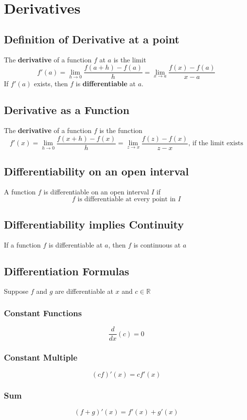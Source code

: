 \documentclass[../ma2002_notes.tex]{subfiles}
\begin{document}
\section{Derivatives}
\subsection{Definition of Derivative at a point}
The \textbf{derivative} of a function \(f\) at \(a\) is the limit
\[f'(a)=\lim_{h\to0}\frac{f(a+h)-f(a)}{h}=\lim_{x\to a}\frac{f(x)-f(a)}{x-a}\]
If \(f'(a)\) exists, then \(f\) is \textbf{differentiable} at \(a\).

\subsection{Derivative as a Function}
The \textbf{derivative} of a function \(f\) is the function
\[f'(x)=\lim_{h\to0}\frac{f(x+h)-f(x)}{h}=\lim_{z\to x}\frac{f(z)-f(x)}{z-x}\text{, if the limit exists}\]

\subsection{Differentiability on an open interval}
A function \(f\) is differentiable on an open interval \(I\) if
\[f\text{ is differentiable at every point in }I\]

\subsection{Differentiability implies Continuity}
If a function \(f\) is differentiable at \(a\), then \(f\) is continuous at \(a\)

\subsection{Differentiation Formulas}
Suppose \(f\) and \(g\) are differentiable at \(x\) and \(c\in\mathbb{R}\)
\subsubsection{Constant Functions}
\[\frac{d}{dx}(c)=0\]

\subsubsection{Constant Multiple}
\[(cf)'(x)=cf'(x)\]

\subsubsection{Sum}
\[(f+g)'(x)=f'(x)+g'(x)\]
\end{document}
